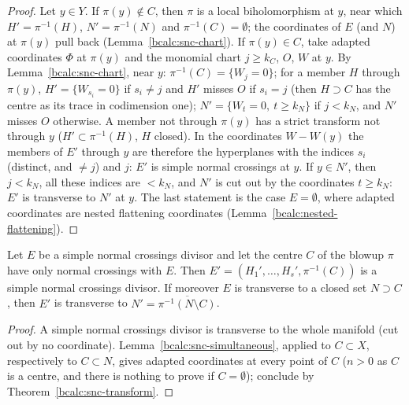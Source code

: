 \begin{proof}
\leanok
Let \(y\in Y\). If \(\pi(y)\notin C\), then \(\pi\) is a local biholomorphism at \(y\), near which \(H'=\pi^{-1}(H)\), \(N'=\pi^{-1}(N)\) and
\(\pi^{-1}(C)=\emptyset\); the coordinates of \(E\) (and \(N\)) at \(\pi(y)\) pull back (Lemma~\ref{bcalc:snc-chart}). If \(\pi(y)\in C\), take adapted
coordinates \(\Phi\) at \(\pi(y)\) and the monomial chart \(j\ge k_C\), \(O\), \(W\) at \(y\). By Lemma~\ref{bcalc:snc-chart}, near \(y\):
\(\pi^{-1}(C)=\{W_j=0\}\); for a member \(H\) through \(\pi(y)\), \(H'=\{W_{s_i}=0\}\) if \(s_i\ne j\) and \(H'\) misses \(O\) if \(s_i=j\) (then \(H\supset C\)
has the centre as its trace in codimension one); \(N'=\{W_t=0,\ t\ge k_N\}\) if \(j<k_N\), and \(N'\) misses \(O\) otherwise. A member not through
\(\pi(y)\) has a strict transform not through \(y\) (\(H'\subset\pi^{-1}(H)\), \(H\) closed). In the coordinates \(W-W(y)\) the members of \(E'\) through \(y\)
are therefore the hyperplanes with the indices \(s_i\) (distinct, and \(\ne j\)) and \(j\): \(E'\) is simple normal crossings at \(y\). If \(y\in N'\), then
\(j<k_N\), all these indices are \(<k_N\), and \(N'\) is cut out by the coordinates \(t\ge k_N\): \(E'\) is transverse to \(N'\) at \(y\). The last
statement is the case \(E=\emptyset\), where adapted coordinates are nested flattening coordinates (Lemma~\ref{bcalc:nested-flattening}).
\end{proof}

\begin{corollary}
\label{bcalc:snc-transform-nc}
\leanok
Let \(E\) be a simple normal crossings divisor and let the centre \(C\) of the blowup \(\pi\) have only normal crossings with \(E\). Then
\(E'=(H_1',\dots,H_s',\pi^{-1}(C))\) is a simple normal crossings divisor. If moreover \(E\) is transverse to a closed set \(N\supset C\), then
\(E'\) is transverse to \(N'=\overline{\pi^{-1}(N\setminus C)}\).
\end{corollary}
\begin{proof}
\leanok
A simple normal crossings divisor is transverse to the whole manifold (cut out by no coordinate). Lemma~\ref{bcalc:snc-simultaneous}, applied
to \(C\subset X\), respectively to \(C\subset N\), gives adapted coordinates at every point of \(C\) (\(n>0\) as \(C\) is a centre, and there is
nothing to prove if \(C=\emptyset\)); conclude by Theorem~\ref{bcalc:snc-transform}.
\end{proof}


